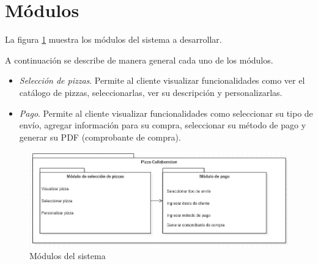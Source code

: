 
\section{Módulos}

	La figura \ref{modulos} muestra los módulos del sistema a desarrollar.


	A continuación se describe de manera general cada uno de los módulos.

	\begin{itemize}

		\item \textit{Selección de pizzas}. Permite al cliente visualizar funcionalidades como ver el catálogo de pizzas, seleccionarlas, ver su descripción y personalizarlas.

		\item \textit{Pago}. Permite al cliente visualizar funcionalidades como seleccionar su tipo de envío,  agregar información para su compra, seleccionar su método de pago y generar su PDF (comprobante de compra).
		

	\end{itemize}

\begin{figure}[h]
	
	\begin{center}
		
		\includegraphics[scale=0.45]{imagenes/modulos/Modulos-PizzaCollaboration.png}
		\caption{Módulos del sistema}
		\label{modulos}
		
	\end{center}
	
\end{figure}

